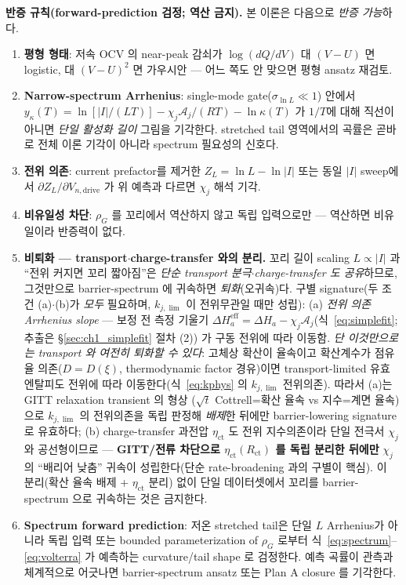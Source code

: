 \documentclass[11pt,a4paper]{article}
\newcommand{\eff}{\mathrm{eff}}
\newcommand{\drive}{\mathrm{drive}}
\begin{document}
\textbf{반증 규칙(forward-prediction 검정; 역산 금지).} 본 이론은 다음으로 \emph{반증 가능}하다.
\begin{enumerate}[label=(N\arabic*),leftmargin=2.4em]
\item \textbf{평형 형태}: 저속 OCV 의 near-peak 감쇠가 $\log(dQ/dV)$ 대 $(V-U)$ 면 logistic, 대 $(V-U)^2$
  면 가우시안 — 어느 쪽도 안 맞으면 평형 ansatz 재검토.
\item \textbf{Narrow-spectrum Arrhenius}: single-mode gate($\sigma_{\ln L}\ll1$) 안에서
  $y_\kappa(T)=\ln[|I|/(LT)]-\chi_j\mathcal A_j/(RT)-\ln\kappa(T)$ 가 $1/T$에 대해 직선이 아니면
  \emph{단일 활성화 길이} 그림을 기각한다. stretched tail 영역에서의 곡률은 곧바로 전체 이론 기각이 아니라
  spectrum 필요성의 신호다.
\item \textbf{전위 의존}: current prefactor를 제거한 $Z_L=\ln L-\ln|I|$ 또는 동일 $|I|$ sweep에서
  $\partial Z_L/\partial V_{n,\drive}$ 가 위 예측과 다르면 $\chi_j$ 해석 기각.
\item \textbf{비유일성 차단}: $\rho_G$ 를 꼬리에서 역산하지 않고 독립 입력으로만 — 역산하면 비유일이라
  반증력이 없다.
\item \textbf{비퇴화 — transport$\cdot$charge-transfer 와의 분리.} 꼬리 길이 scaling
  $L\propto|I|$ 과 ``전위 커지면 꼬리 짧아짐''은 \emph{단순 transport 분극$\cdot$charge-transfer 도 공유}하므로,
  그것만으로 barrier-spectrum 에 귀속하면 \emph{퇴화}(오귀속)다. 구별 signature(두 조건 (a)$\cdot$(b)가 \emph{모두}
  필요하며, $k_{j,\lim}$ 이 전위무관일 때만 성립): (a) \emph{전위 의존 Arrhenius slope} — 보정 전 측정 기울기
  $\Delta H_a^{\eff}=\Delta H_a-\chi_j\mathcal A_j$(식~\eqref{eq:simplefit}; 추출은 \S\ref{sec:ch1_simplefit} 절차 (2))
  가 구동 전위에 따라 이동함. \emph{단 이것만으로는 transport 와 여전히 퇴화할 수 있다}: 고체상 확산이 율속이고
  확산계수가 점유율 의존($D=D(\xi)$, thermodynamic factor 경유)이면 transport-limited 유효 엔탈피도 전위에 따라
  이동한다(식~\eqref{eq:kphys} 의 $k_{j,\lim}$ 전위의존). 따라서 (a)는 GITT relaxation transient 의 형상
  ($\sqrt t$ Cottrell=확산 율속 vs 지수=계면 율속)으로 $k_{j,\lim}$ 의 전위의존을 독립 판정해 \emph{배제}한 뒤에만
  barrier-lowering signature 로 유효하다; (b) charge-transfer 과전압 $\eta_{\mathrm{ct}}$ 도 전위 지수의존이라 단일
  전극서 $\chi_j$ 와 공선형이므로 — \textbf{GITT/전류 차단으로 $\eta_{\mathrm{ct}}(R_{\mathrm{ct}})$ 를 독립 분리한
  뒤에만} $\chi_j$ 의 ``배리어 낮춤'' 귀속이 성립한다(단순 rate-broadening \cite{dubarry2022,fly2020} 과의 구별이
  핵심). 이 분리(확산 율속 배제 + $\eta_{\mathrm{ct}}$ 분리) 없이 단일 데이터셋에서 꼬리를 barrier-spectrum 으로
  귀속하는 것은 금지한다.
\item \textbf{Spectrum forward prediction}: 저온 stretched tail은 단일 $L$ Arrhenius가 아니라 독립 입력 또는 bounded
  parameterization of $\rho_G$ 로부터 식~\eqref{eq:spectrum}--\eqref{eq:volterra} 가 예측하는 curvature/tail shape 로 검정한다.
  예측 곡률이 관측과 체계적으로 어긋나면 barrier-spectrum ansatz 또는 Plan A closure 를 기각한다.
\end{enumerate}
\end{document}
